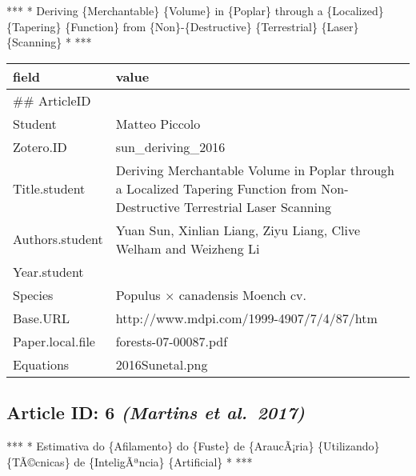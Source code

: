 \documentclass[]{article}
\begin{document}
*** * Deriving \{Merchantable\} \{Volume\} in \{Poplar\} through a
\{Localized\} \{Tapering\} \{Function\} from \{Non\}-\{Destructive\}
\{Terrestrial\} \{Laser\} \{Scanning\} * ***

\begin{table}[H]
\centering
\begin{tabular}{>{\raggedright\arraybackslash}p{2cm}>{\raggedright\arraybackslash}p{8cm}}
\toprule
field & value\\
\midrule
\#\# ArticleID & 5\\
Student & Matteo Piccolo\\
Zotero.ID & sun\_deriving\_2016\\
Title.student & Deriving Merchantable Volume in Poplar through a Localized Tapering Function from Non-Destructive Terrestrial Laser Scanning\\
Authors.student & Yuan Sun, Xinlian Liang, Ziyu Liang, Clive Welham and Weizheng Li\\
\addlinespace
Year.student & 2016\\
Species & Populus × canadensis Moench cv.\\
Base.URL & http://www.mdpi.com/1999-4907/7/4/87/htm\\
Paper.local.file & forests-07-00087.pdf\\
Equations & 2016Sunetal.png\\
\bottomrule
\end{tabular}
\end{table}

\hypertarget{article-id-6-martins-et-al.2017}{%
\subsection{\texorpdfstring{Article ID: 6 \textbf{\emph{(Martins et
al.~2017)}}}{Article ID: 6 (Martins et al.~2017)}}\label{article-id-6-martins-et-al.2017}}

*** * Estimativa do \{Afilamento\} do \{Fuste\} de \{AraucÃ¡ria\}
\{Utilizando\} \{TÃ©cnicas\} de \{InteligÃªncia\} \{Artificial\} * ***
\end{document}
